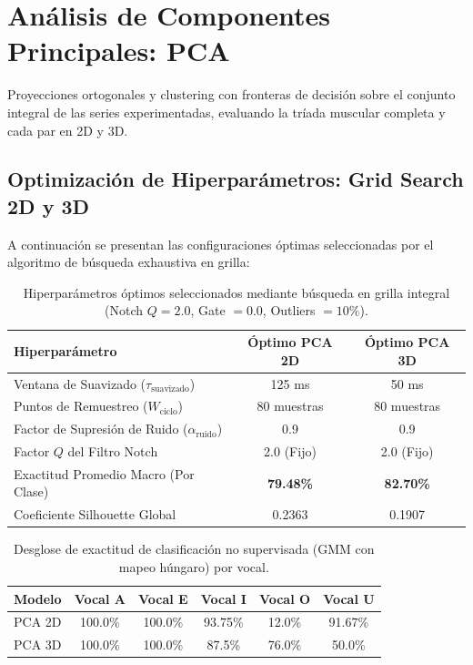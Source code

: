 \documentclass[11pt,a4paper]{article}
\begin{document}
\newpage
\section{Análisis de Componentes Principales: PCA}
Proyecciones ortogonales y clustering con fronteras de decisión sobre el conjunto integral de las series experimentadas, evaluando la tríada muscular completa y cada par en 2D y 3D.

\subsection{Optimización de Hiperparámetros: Grid Search 2D y 3D}
A continuación se presentan las configuraciones óptimas seleccionadas por el algoritmo de búsqueda exhaustiva en grilla:
\begin{table}[H]
\centering
\begin{tabular}{lcc}
\toprule
\textbf{Hiperparámetro} & \textbf{Óptimo PCA 2D} & \textbf{Óptimo PCA 3D} \\
\midrule
Ventana de Suavizado ($\tau_{\text{suavizado}}$) & 125 ms & 50 ms \\
Puntos de Remuestreo ($W_{\text{ciclo}}$) & 80 muestras & 80 muestras \\
Factor de Supresión de Ruido ($\alpha_{\text{ruido}}$) & 0.9 & 0.9 \\
Factor $Q$ del Filtro Notch & 2.0 (Fijo) & 2.0 (Fijo) \\
\midrule
Exactitud Promedio Macro (Por Clase) & \textbf{79.48\%} & \textbf{82.70\%} \\
Coeficiente Silhouette Global & 0.2363 & 0.1907 \\
\bottomrule
\end{tabular}
\caption{Hiperparámetros óptimos seleccionados mediante búsqueda en grilla integral (Notch $Q=2.0$, Gate $=0.0$, Outliers $=10\%$).}
\end{table}

\begin{table}[H]
\centering
\begin{tabular}{cccccc}
\toprule
\textbf{Modelo} & \textbf{Vocal A} & \textbf{Vocal E} & \textbf{Vocal I} & \textbf{Vocal O} & \textbf{Vocal U} \\
\midrule
PCA 2D & 100.0\% & 100.0\% & 93.75\% & 12.0\% & 91.67\% \\
PCA 3D & 100.0\% & 100.0\% & 87.5\% & 76.0\% & 50.0\% \\
\bottomrule
\end{tabular}
\caption{Desglose de exactitud de clasificación no supervisada (GMM con mapeo húngaro) por vocal.}
\end{table}
\end{document}
